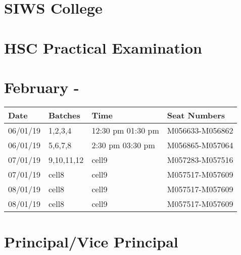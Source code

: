 \documentclass[17pt]{extarticle}
\begin{document}
\section*{SIWS College}
\section*{HSC Practical Examination }
\section*{February - \the\year }
\vspace{1cm}
\begin{center}
\begin{tabular}{ | m{2.5cm} | m{2.5cm}| m{4.6cm} |  m{6cm} | } 
  \hline
  Date
  &Batches
  &Time
  &Seat Numbers
  \\ 
    
  \hline
  06/01/19
  &1,2,3,4
  &12:30 pm 01:30 pm
  &M056633-M056862
  \\ 
  
  \hline
  06/01/19
  & 5,6,7,8
  & 2:30 pm 03:30 pm
  & M056865-M057064
  \\ 
  
  
  \hline
   07/01/19 
    & 9,10,11,12 
    & cell9 
    &M057283-M057516
    \\ 
  \hline
  
    07/01/19 
    & cell8 
    & cell9 
    &M057517-M057609
    \\ 
  \hline

    08/01/19 
    & cell8 
    & cell9 
    &M057517-M057609
    \\ 
  \hline

    08/01/19 
    & cell8 
    & cell9 
    &M057517-M057609
    \\ 
  \hline

\end{tabular}
\end{center}
\vspace{2cm}
\section*{Principal/Vice Principal}
\end{document}
